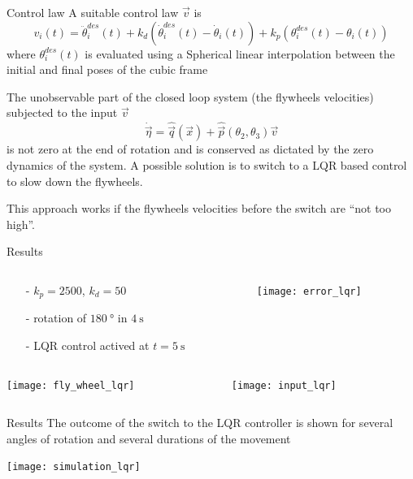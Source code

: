 \begin{frame}{Control law \hfill \color{red}{XYZ}}
  A suitable control law $\vec{v}$ is
  {\small
    \[
    v_i(t) = \ddot{\theta}_i^{des}(t) + k_d(\dot{\theta}_i^{des}(t) - \dot{\theta}_i(t)) + k_p (\theta_i^{des}(t) - \theta_i(t))
    \]
  }
  where $\theta_i^{des}(t)$ is evaluated using a Spherical linear interpolation between the initial and final poses of the cubic frame
  \par
  The unobservable part of the closed loop system (the flywheels velocities) subjected to the input $\vec{v}$
  \[
  \dot{\vec{\eta}} =
  \hat{\vec{q}}(\vec{x}) + \hat{\vec{p}}(\theta_{2},\theta_{3})\vec{v}
  \]
  is \alert{not zero} at the end of rotation and is conserved
  as dictated by the zero dynamics of the system.
  A possible solution is to switch to a \alert{LQR} based control to slow down the flywheels.
  \par
  This approach works if the flywheels velocities before the switch are ``not too high''.
\end{frame}

\begin{frame}{Results \hfill \color{red}{XYZ}}
  \vskip0.1in
  \begin{columns}
    \begin{column}{0.45\textwidth}
      \begin{itemize}
      \item[-]$k_p = 2500$, $k_d = 50$
      \item[-]rotation of $\SI{180}{\degree}$ in $\SI{4}{\second}$
      \item[-]\alert{LQR control actived at $t = \SI{5}{\second}$}
      \end{itemize}
    \end{column}
    \begin{column}{0.45\textwidth}
      \texttt{[image: error\_lqr]}
    \end{column}
  \end{columns}
  \begin{columns}
    \begin{column}{0.45\textwidth}
      \texttt{[image: fly\_wheel\_lqr]}
    \end{column}
    \begin{column}{0.45\textwidth}
      \texttt{[image: input\_lqr]}
    \end{column}
  \end{columns}
\end{frame}

\begin{frame}{Results \hfill \color{red}{XYZ}}
  The outcome of the switch to the LQR controller
  is shown for several angles of rotation and several durations of the movement
  \par
  \centering
  \texttt{[image: simulation\_lqr]}
\end{frame}


